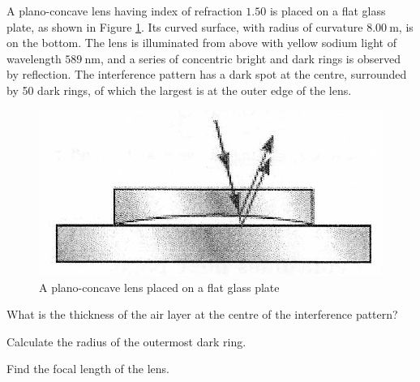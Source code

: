 \begin{problem}
    A plano-concave lens having index of refraction $1.50$ is placed on a flat glass plate, as shown in Figure \ref{2010q8}. Its curved surface, with radius of curvature $\qty{8.00}{\m}$, is on the bottom. The lens is illuminated from above with yellow sodium light of wavelength $\qty{589}{\nm}$, and a series of concentric bright and dark rings is observed by reflection. The interference pattern has a dark spot at the centre, surrounded by 50 dark rings, of which the largest is at the outer edge of the lens.
    \begin{figure}[h]
	    \centering
	    \includegraphics[width=0.5\linewidth]{spho_book_TYS_images/2010q8.png}
	    \caption{A plano-concave lens placed on a flat glass plate} \label{2010q8}
    \end{figure}
    \begin{subproblem}
        What is the thickness of the air layer at the centre of the interference pattern?
    \end{subproblem}
    \begin{subproblem}
        Calculate the radius of the outermost dark ring.
    \end{subproblem}
    \begin{subproblem}
        Find the focal length of the lens.
    \end{subproblem}
\end{problem}

